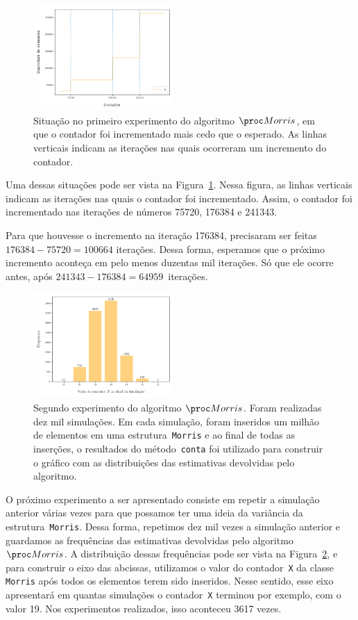 \begin{figure}[h]
  \centering
  \includegraphics[height=4cm, width=.5\textwidth]{figuras/morris_interval.png}
	\caption{Situação no primeiro experimento do algoritmo $\Morris$, em que o contador foi incrementado mais cedo que o 
  esperado. As linhas verticais indicam as iterações nas quais ocorreram um incremento do contador. }
  \label{fig:morris:interval}
\end{figure}

Uma dessas situações pode ser vista na Figura~\ref{fig:morris:interval}. Nessa figura, as linhas verticais indicam as 
iterações nas quais o contador foi incrementado. Assim, o contador foi incrementado nas iterações de números 75720, 
176384 e 241343. 

Para que houvesse o incremento na iteração 176384, precisaram ser feitas $176384 - 75720 = 100664$ iterações. Dessa 
forma, esperamos que o próximo incremento aconteça em pelo menos duzentas mil iterações. Só que ele ocorre antes, após 
$241343 - 176384 = 64959$~iterações.

\begin{figure}[h]
  \centering
  \includegraphics[height=4cm, width=.5\textwidth]{figuras/morris_variance.png}
	\caption{Segundo experimento do algoritmo $\Morris$. Foram realizadas dez mil simulações. Em cada simulação, foram 
  inseridos um milhão de elementos em uma estrutura~\texttt{Morris} e ao final de todas as inserções, o resultados do 
  método~\texttt{conta} foi utilizado para construir o gráfico com as distribuições das estimativas devolvidas pelo 
  algoritmo.}
  \label{fig:morris:variance}
\end{figure}

O próximo experimento a ser apresentado consiste em repetir a simulação anterior várias vezes para que possamos ter uma 
ideia da variância da estrutura~\texttt{Morris}. Dessa forma, repetimos dez mil vezes a simulação anterior e guardamos 
as frequências das estimativas devolvidas pelo algoritmo~$\Morris$. A distribuição dessas frequências pode ser vista na 
Figura~\ref{fig:morris:variance}, e para construir o eixo das abcissas, utilizamos o valor do contador~\texttt{X} da 
classe \texttt{Morris} após todos os elementos terem sido inseridos. Nesse sentido, esse eixo apresentará em quantas 
simulações o contador~\texttt{X} terminou por exemplo, com o valor 19. Nos experimentos realizados, isso aconteceu 3617 
vezes.

